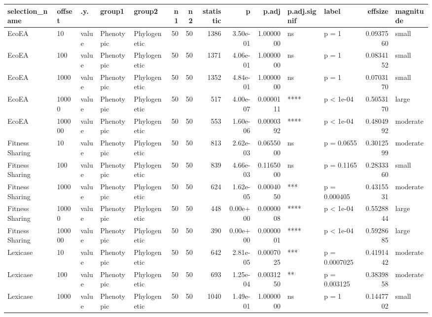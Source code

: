 \documentclass[]{book}
\begin{document}
\begin{table}
\centering
\begin{tabular}[t]{l|l|l|l|l|r|r|r|r|r|l|l|r|l}
\hline
selection\_name & offset & .y. & group1 & group2 & n1 & n2 & statistic & p & p.adj & p.adj.signif & label & effsize & magnitude\\
\hline
EcoEA & 10 & value & Phenotypic & Phylogenetic & 50 & 50 & 1386 & 3.50e-01 & 1.0000000 & ns & p = 1 & 0.0937560 & small\\
\hline
EcoEA & 100 & value & Phenotypic & Phylogenetic & 50 & 50 & 1371 & 4.06e-01 & 1.0000000 & ns & p = 1 & 0.0834152 & small\\
\hline
EcoEA & 1000 & value & Phenotypic & Phylogenetic & 50 & 50 & 1352 & 4.84e-01 & 1.0000000 & ns & p = 1 & 0.0703170 & small\\
\hline
EcoEA & 10000 & value & Phenotypic & Phylogenetic & 50 & 50 & 517 & 4.00e-07 & 0.0000111 & **** & p < 1e-04 & 0.5053170 & large\\
\hline
EcoEA & 100000 & value & Phenotypic & Phylogenetic & 50 & 50 & 553 & 1.60e-06 & 0.0000392 & **** & p < 1e-04 & 0.4804992 & moderate\\
\hline
Fitness Sharing & 10 & value & Phenotypic & Phylogenetic & 50 & 50 & 813 & 2.62e-03 & 0.0655000 & ns & p = 0.0655 & 0.3012599 & moderate\\
\hline
Fitness Sharing & 100 & value & Phenotypic & Phylogenetic & 50 & 50 & 839 & 4.66e-03 & 0.1165000 & ns & p = 0.1165 & 0.2833360 & small\\
\hline
Fitness Sharing & 1000 & value & Phenotypic & Phylogenetic & 50 & 50 & 624 & 1.62e-05 & 0.0004050 & *** & p = 0.000405 & 0.4315531 & moderate\\
\hline
Fitness Sharing & 10000 & value & Phenotypic & Phylogenetic & 50 & 50 & 448 & 0.00e+00 & 0.0000008 & **** & p < 1e-04 & 0.5528844 & large\\
\hline
Fitness Sharing & 100000 & value & Phenotypic & Phylogenetic & 50 & 50 & 390 & 0.00e+00 & 0.0000001 & **** & p < 1e-04 & 0.5928685 & large\\
\hline
Lexicase & 10 & value & Phenotypic & Phylogenetic & 50 & 50 & 642 & 2.81e-05 & 0.0007025 & *** & p = 0.0007025 & 0.4191442 & moderate\\
\hline
Lexicase & 100 & value & Phenotypic & Phylogenetic & 50 & 50 & 693 & 1.25e-04 & 0.0031250 & ** & p = 0.003125 & 0.3839858 & moderate\\
\hline
Lexicase & 1000 & value & Phenotypic & Phylogenetic & 50 & 50 & 1040 & 1.49e-01 & 1.0000000 & ns & p = 1 & 0.1447702 & small\\

\end{tabular}
\end{table}
\end{document}
